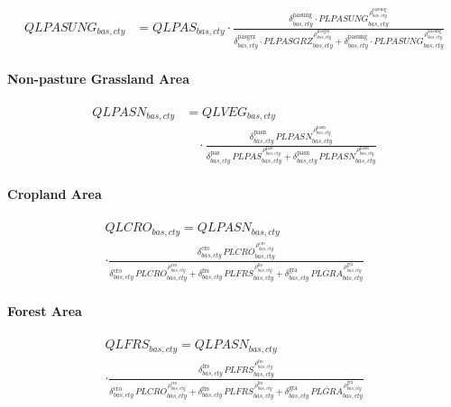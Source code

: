 \begin{align}
  QLPASUNG_{bas,cty}
  &=
    QLPAS_{bas,cty}
    \cdot
    \frac{
      \delta^{\text{pasung}}_{bas,cty}
      \cdot
      PLPASUNG_{bas,cty}^{\,\rho^{\text{pasung}}_{bas,cty}}
    }{
      \delta^{\text{pasgrz}}_{bas,cty}
      \cdot
      PLPASGRZ_{bas,cty}^{\,\rho^{\text{pasgrz}}_{bas,cty}}
      +
      \delta^{\text{pasung}}_{bas,cty}
      \cdot
      PLPASUNG_{bas,cty}^{\,\rho^{\text{pasung}}_{bas,cty}}
    }
  \tag{QLPASUNGEQ}\label{eq:QLPASUNGEQ}
\end{align}


\paragraph{Non-pasture Grassland Area}
\begin{align}
  QLPASN_{bas,cty}
  &=
    QLVEG_{bas,cty}
    \nonumber\\[-0.3em]
  &\quad\cdot
    \frac{
      \delta^{\text{pasn}}_{bas,cty}
      \, PLPASN_{bas,cty}^{\,\rho^{\text{pasn}}_{bas,cty}}
    }{
      \delta^{\text{pas}}_{bas,cty}
      \, PLPAS_{bas,cty}^{\,\rho^{\text{pas}}_{bas,cty}}
      +
      \delta^{\text{pasn}}_{bas,cty}
      \, PLPASN_{bas,cty}^{\,\rho^{\text{pasn}}_{bas,cty}}
    }
  \tag{QLPASNEQ}\label{eq:QLPASNEQ}
\end{align}

\paragraph{Cropland Area}
\begin{multline}
  QLCRO_{bas,cty} = QLPASN_{bas,cty}\\
  \cdot
  \frac{
    \delta^{\text{cro}}_{bas,cty}\, PLCRO_{bas,cty}^{\,\rho^{\text{cro}}_{bas,cty}}
  }{
    \delta^{\text{cro}}_{bas,cty}\, PLCRO_{bas,cty}^{\,\rho^{\text{cro}}_{bas,cty}}
    + \delta^{\text{frs}}_{bas,cty}\, PLFRS_{bas,cty}^{\,\rho^{\text{frs}}_{bas,cty}}
    + \delta^{\text{gra}}_{bas,cty}\, \overline{PLGRA}_{bas,cty}^{\,\rho^{\text{gra}}_{bas,cty}}
  }
  \tag{QLCROEQ}\label{eq:QLCROEQ}
\end{multline}

\paragraph{Forest Area}
\begin{multline}
  QLFRS_{bas,cty} = QLPASN_{bas,cty}\\
  \cdot
  \frac{
    \delta^{\text{frs}}_{bas,cty}\, PLFRS_{bas,cty}^{\,\rho^{\text{frs}}_{bas,cty}}
  }{
    \delta^{\text{cro}}_{bas,cty}\, PLCRO_{bas,cty}^{\,\rho^{\text{cro}}_{bas,cty}}
    + \delta^{\text{frs}}_{bas,cty}\, PLFRS_{bas,cty}^{\,\rho^{\text{frs}}_{bas,cty}}
    + \delta^{\text{gra}}_{bas,cty}\, \overline{PLGRA}_{bas,cty}^{\,\rho^{\text{gra}}_{bas,cty}}
  }
  \tag{QLFRSEQ}\label{eq:QLFRSEQ}
\end{multline}

